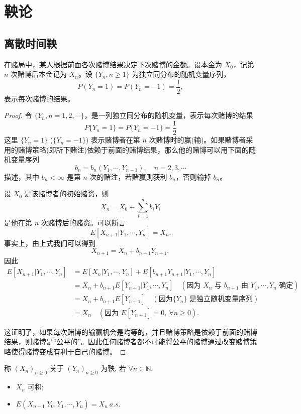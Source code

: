 \documentclass[lang=cn,10pt,thmcnt=section]{elegantbook}
\begin{document}
\chapter{鞅论}
\section{离散时间鞅}
\begin{example}
	在赌局中，某人根据前面各次赌博结果决定下次赌博的金额。设本金为 $X_0$，记第 $n$ 次赌博后本金记为 $X_n$。设 $\{Y_n, n \geq 1\}$ 为独立同分布的随机变量序列，
\[
P(Y_n = 1) = P(Y_n = -1) = \frac{1}{2},
\]
表示每次赌博的结果。

\end{example}
\begin{proof}
	令 $\{Y_n, n = 1, 2, \cdots\}$，是一列独立同分布的随机变量，表示每次赌博的结果
	\[
	P\{Y_n = 1\} = P\{Y_n = -1\} = \frac{1}{2}
	\]
	这里 $\{Y_n = 1\}$ ($\{Y_n = -1\}$) 表示赌博者在第 $n$ 次赌博时的赢(输)。如果赌博者采用的赌博策略(即所下赌注)依赖于前面的赌博结果，那么他的赌博可以用下面的随机变量序列
	\[
	b_n = b_n(Y_1, \cdots, Y_{n-1}), \quad n = 2, 3, \cdots
	\]
	描述，其中 $b_n < \infty$ 是第 $n$ 次的赌注，若赌赢则获利 $b_n$，否则输掉 $b_n$。
	
	设 $X_0$ 是该赌博者的初始赌资，则
	\[
	X_n = X_0 + \sum_{i=1}^{n} b_i Y_i 
	\]
	是他在第 $n$ 次赌博后的赌资。可以断言
	\[
	E[X_{n+1} | Y_1, \cdots, Y_n] = X_n.
	\]
	事实上，由上式我们可以得到
	\[
	X_{n+1} = X_n + b_{n+1} Y_{n+1},
	\]
	因此
	\begin{align*}
	E[X_{n+1} | Y_1, \cdots, Y_n] &= E[X_n | Y_1, \cdots, Y_n] + E[b_{n+1} Y_{n+1} | Y_1, \cdots, Y_n] \\
	&= X_n + b_{n+1} E[Y_{n+1} | Y_1, \cdots, Y_n] \quad (\text{因为 } X_n \text{ 与 } b_{n+1} \text{ 由 } Y_1, \cdots, Y_n \text{ 确定}) \\
	&= X_n + b_{n+1} E[Y_{n+1}] \quad (\text{因为} \{Y_n\} \text{ 是独立随机变量序列}) \\
	&= X_n \quad (\text{因为 } E[Y_{n+1}] = 0, \ \forall n \geq 0).
	\end{align*}
	
	这证明了，如果每次赌博的输赢机会是均等的，并且赌博策略是依赖于前面的赌博结果，则赌博是“公平的”。因此任何赌博者都不可能将公平的赌博通过改变赌博策略使得赌博变成有利于自己的赌博。
	

	
\end{proof}
\begin{definition}[鞅]
	称 $(X_n)_{n \geq 0}$ 关于 $(Y_n)_{n \geq 0}$ 为鞅, 若 $\forall n \in \mathbb{N}$,
\begin{itemize}
    \item $X_n$ 可积;
    \item $E(X_{n+1} | Y_0, Y_1, \cdots, Y_n) = X_n \ a.s.$
\end{itemize}
\end{definition}
\end{document}
